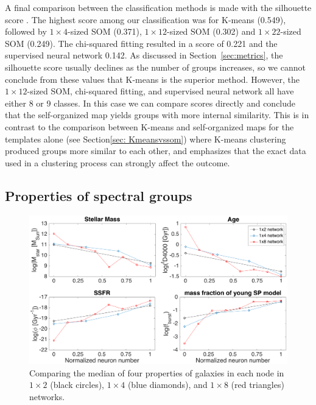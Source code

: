 A final comparison between the classification methods is 
made with the silhouette score  \citep{rousseeuw87}.
The highest score among our classification was for K-means (0.549), followed by $1\times4$-sized SOM (0.371), $1\times12$-sized SOM (0.302) and $1\times22$-sized SOM (0.249).
The chi-squared fitting resulted in a score of 0.221 and the supervised neural network 0.142.
As discussed in Section~\ref{sec:metrics}, the silhouette score usually declines as the number of groups increases, so we cannot conclude from these values that K-means is the superior method. 
However, the $1\times12$-sized SOM, chi-squared fitting, and supervised neural network all have either 8 or 9 classes.
In this case we can compare scores directly and conclude that the self-organized map yields groups with more internal similarity.
This is in contrast to the comparison between K-means and self-organized maps for the templates alone (see Section\ref{sec: Kmeansvssom}) where K-means clustering  produced groups more similar to each other, and emphasizes that the exact data used in a clustering process can strongly affect the outcome.


 \subsection{Properties of spectral groups}
       
       \begin{figure}
            \centering
            \includegraphics[width=\textwidth]{images0.01/1d/props5.png}
            \caption[The median of four properties of galaxies in three networks]{Comparing the median of four properties of galaxies in each node in $1\times2$ (black circles), $1\times4$ (blue diamonds), and $1\times8$ (red triangles) networks.}
            \label{fig: props}
        \end{figure} 
        
